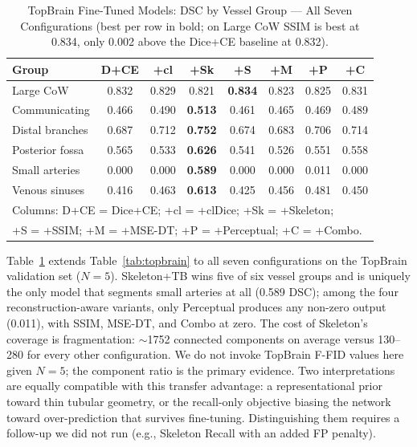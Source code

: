 \documentclass[conference]{IEEEtran}
\begin{document}
\begin{table}[t]
\centering
\caption{TopBrain Fine-Tuned Models: DSC by Vessel Group --- All Seven Configurations (best per row in bold; on Large CoW SSIM is best at 0.834, only 0.002 above the Dice+CE baseline at 0.832).}
\label{tab:topbrain_extended}
\setlength{\tabcolsep}{3.2pt}
\footnotesize
\begin{tabular}{lccccccc}
\toprule
\textbf{Group} & \textbf{D+CE} & \textbf{+cl} & \textbf{+Sk} & \textbf{+S} & \textbf{+M} & \textbf{+P} & \textbf{+C} \\
\midrule
Large CoW       & 0.832 & 0.829 & 0.821 & \textbf{0.834} & 0.823 & 0.825 & 0.831 \\
Communicating   & 0.466 & 0.490 & \textbf{0.513} & 0.461 & 0.465 & 0.469 & 0.489 \\
Distal branches & 0.687 & 0.712 & \textbf{0.752} & 0.674 & 0.683 & 0.706 & 0.714 \\
Posterior fossa & 0.565 & 0.533 & \textbf{0.626} & 0.541 & 0.526 & 0.551 & 0.558 \\
Small arteries  & 0.000 & 0.000 & \textbf{0.589} & 0.000 & 0.000 & 0.011 & 0.000 \\
Venous sinuses  & 0.416 & 0.463 & \textbf{0.613} & 0.425 & 0.456 & 0.481 & 0.450 \\
\bottomrule
\multicolumn{8}{l}{\scriptsize Columns: D+CE = Dice+CE; +cl = +clDice; +Sk = +Skeleton;}\\
\multicolumn{8}{l}{\scriptsize +S = +SSIM; +M = +MSE-DT; +P = +Perceptual; +C = +Combo.}
\end{tabular}
\end{table}

Table~\ref{tab:topbrain_extended} extends Table~\ref{tab:topbrain} to all seven configurations on the TopBrain validation set ($N{=}5$). Skeleton+TB wins five of six vessel groups and is uniquely the only model that segments small arteries at all (0.589 DSC); among the four reconstruction-aware variants, only Perceptual produces any non-zero output (0.011), with SSIM, MSE-DT, and Combo at zero. The cost of Skeleton's coverage is fragmentation: $\sim$1752 connected components on average versus 130--280 for every other configuration. We do not invoke TopBrain F-FID values here given $N{=}5$; the component ratio is the primary evidence. Two interpretations are equally compatible with this transfer advantage: a representational prior toward thin tubular geometry, or the recall-only objective biasing the network toward over-prediction that survives fine-tuning. Distinguishing them requires a follow-up we did not run (e.g., Skeleton Recall with an added FP penalty).
\end{document}
